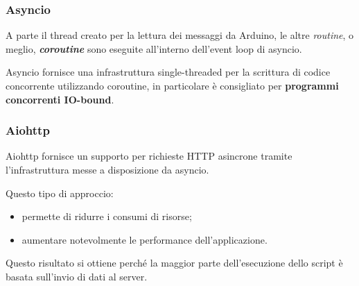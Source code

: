\subsubsection{Asyncio}
A parte il thread creato per la lettura dei messaggi da Arduino, le altre \textit{routine}, o meglio, \textit{\textbf{coroutine}} sono eseguite all'interno dell'event loop di asyncio. 

Asyncio fornisce una infrastruttura single-threaded per la scrittura di codice concorrente utilizzando coroutine, in particolare è consigliato per \textbf{programmi concorrenti IO-bound}. 

\subsubsection{Aiohttp}
Aiohttp fornisce un supporto per richieste HTTP asincrone tramite l'infrastruttura messe a disposizione da asyncio.

Questo tipo di approccio:
\begin{itemize}
	\item permette di ridurre i consumi di risorse;
	\item aumentare notevolmente le performance dell'applicazione.
\end{itemize}
Questo risultato si ottiene perché la maggior parte dell'esecuzione dello script è basata sull'invio di dati al server.

